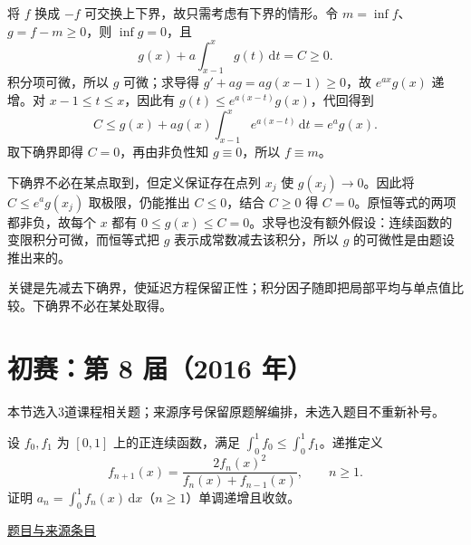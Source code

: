 \documentclass[12pt,fontset=fandol]{ctexart}
\begin{document}
\begin{solve}\label{ans:pre07-math:6}

将 $f$ 换成 $-f$ 可交换上下界，故只需考虑有下界的情形。令 $m=\inf f$、$g=f-m\ge0$，则 $\inf g=0$，且
\[
g(x)+a\int_{x-1}^xg(t)\,\mathrm dt=C\ge0.
\]
积分项可微，所以 $g$ 可微；求导得 $g'+ag=ag(x-1)\ge0$，故 $e^{ax}g(x)$ 递增。对 $x-1\le t\le x$，因此有 $g(t)\le e^{a(x-t)}g(x)$，代回得到
\[
C\le g(x)+ag(x)\int_{x-1}^xe^{a(x-t)}\,\mathrm dt=e^ag(x).
\]
取下确界即得 $C=0$，再由非负性知 $g\equiv0$，所以 $f\equiv m$。

下确界不必在某点取到，但定义保证存在点列 $x_j$ 使 $g(x_j)\to0$。因此将 $C\le e^ag(x_j)$ 取极限，仍能推出 $C\le0$，结合 $C\ge0$ 得 $C=0$。原恒等式的两项都非负，故每个 $x$ 都有 $0\le g(x)\le C=0$。求导也没有额外假设：连续函数的变限积分可微，而恒等式把 $g$ 表示成常数减去该积分，所以 $g$ 的可微性是由题设推出来的。

\end{solve}

\begin{remark}[方法与条件]关键是先减去下确界，使延迟方程保留正性；积分因子随即把局部平均与单点值比较。下确界不必在某处取得。\end{remark}

\section{初赛：第 8 届（2016 年）}

本节选入3道课程相关题；来源序号保留原题解编排，未选入题目不重新补号。

\begin{example}[来源序号4]\label{ex:pre08-math:4}\label{pr:pre08-math:4}

设 $f_0,f_1$ 为 $[0,1]$ 上的正连续函数，满足 $\int_0^1f_0\le\int_0^1f_1$。递推定义
\[
f_{n+1}(x)=\frac{2f_n(x)^2}{f_n(x)+f_{n-1}(x)},\qquad n\ge1.
\]
证明 $a_n=\int_0^1f_n(x)\,\mathrm dx$（$n\ge1$）单调递增且收敛。

\par\href{https://github.com/lzxcr/cmc-mathematics/blob/64916fa1fdbc3e444a652eca204d5669058ee321/src/problems/preliminary/08/04.md}{题目与来源条目}

\end{example}
\end{document}
